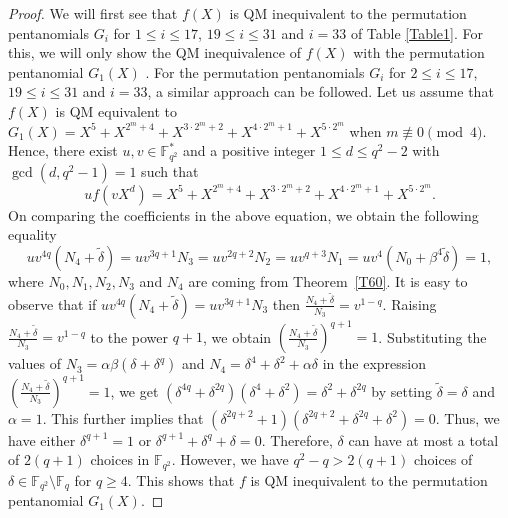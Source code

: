 \documentclass[12pt]{amsart}
\numberwithin{equation}{section}
\theoremstyle{definition}
\newcommand{\F}{\mathbb F}
\begin{document}
\begin{proof}
We will first see that $f(X)$ is QM inequivalent to the permutation pentanomials $G_i$ for $1 \leq i \leq 17$, $19 \leq i \leq 31$ and $i=33$ of Table \ref{Table1}. For this, we will only show the QM inequivalence of $f(X)$ with the permutation pentanomial $G_1(X)$ . For the permutation pentanomials $G_i$ for $2 \leq i \leq 17$, $19 \leq i \leq 31$ and $i=33$, a similar approach can be followed.
Let us assume that $f(X)$ is QM equivalent to $G_1(X)=X^5 + X^{2^m+4} + X^{3 \cdot 2^m+2} + X^{4 \cdot 2^m +1} + X^{5 \cdot 2^m}$ when $m \not \equiv 0 \pmod 4$. Hence, there exist $u,v\in \F_{q^2}^{*}$ and a positive integer $1 \leq d \leq q^2-2$ with $\gcd(d,q^2-1)=1$ such that 
 $$uf(vX^d)=X^5 + X^{2^m+4} + X^{3 \cdot 2^m+2} + X^{4 \cdot 2^m +1} + X^{5 \cdot 2^m}.$$
On comparing the coefficients in the above equation, we obtain the following equality $$uv^{4q}(N_4+\tilde \delta)=uv^{3q+1}N_3=uv^{2q+2}N_2=uv^{q+3} N_1=uv^4(N_0+\beta^4\tilde\delta)=1,$$
where $N_0, N_1, N_2, N_3$ and $N_4$ are coming from Theorem~\ref{T60}. It is easy to observe that if $uv^{4q}(N_4+\tilde \delta)=uv^{3q+1}N_3$ then $\frac{N_4+\tilde \delta}{N_3}=v^{1-q}$. Raising $\frac{N_4+\tilde \delta}{N_3}=v^{1-q}$ to the power $q+1$, we obtain $\left(\frac{N_4+\tilde \delta}{N_3}\right)^{q+1}=1$. Substituting the values of $N_3=\alpha\beta(\delta+\delta^q)$ and $N_4=\delta^4+\delta^2+\alpha\delta$ in the expression $\left(\frac{N_4+\tilde \delta}{N_3}\right)^{q+1}=1$, we get $(\delta^{4q}+\delta^{2q})(\delta^{4}+\delta^{2})=\delta^2+\delta^{2q}$ by setting $\tilde \delta=\delta$ and $\alpha=1$. This further implies that $(\delta^{2q+2}+1)(\delta^{2q+2}+\delta^{2q}+\delta^2)=0$. Thus, we have either $\delta^{q+1}=1$ or $\delta^{q+1}+\delta^q+\delta=0$. Therefore, $\delta$ can have at most a total of $2(q+1)$ choices in $\F_{q^2}$. However, we have $q^2-q > 2(q+1)$ choices of $\delta \in \F_{q^2} \setminus \F_q$ for $q \geq 4$. This shows that $f$ is QM inequivalent to the permutation pentanomial $G_1(X)$. 



\end{proof}
\end{document}
